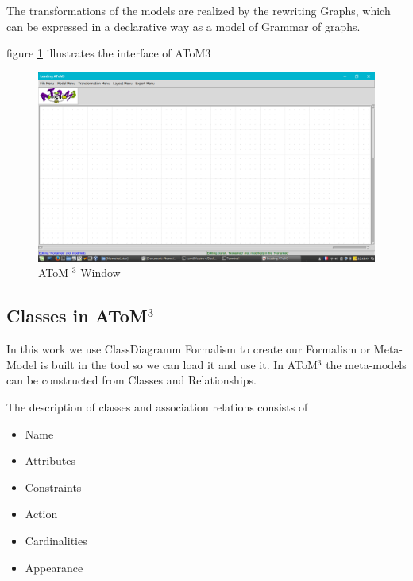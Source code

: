  The transformations of the models are realized by the rewriting
Graphs, which can be expressed in a declarative way as a model of
Grammar of graphs\cite{ch3-meta2}.

 figure \ref{fig:AToM3 Window} illustrates the interface of AToM3 

\begin{figure}[th]
	\centering
		\includegraphics[scale=0.33]{ch3/img/atom3}
	\caption{\label{fig:AToM3 Window}AToM $^{3}$ Window}
\end{figure} 
\pagebreak
\subsection{Classes in AToM$^{3}$ }
In this work we use ClassDiagramm Formalism to create  our Formalism 
or Meta-Model is built in the tool so we can load it and use  it\cite{ch3-meta2}.
In AToM$^{3}$ the meta-models can be constructed from Classes and
Relationships.

The description of classes and association relations consists of

\begin{itemize}
\newcommand{\localtextbulletone}{\textcolor{gray}{\raisebox{.45ex}{\rule{.6ex}{.6ex}}}}
\renewcommand{\labelitemi}{\localtextbulletone}
\item  Name
\item  Attributes
\item  Constraints
\item  Action
\item  Cardinalities
\item  Appearance
\end{itemize}

